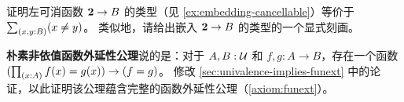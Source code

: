 \begin{ex}\label{ex:cancellable-from-bool}
  证明左可消函数 $\mathbf{2}\to B$ 的类型（见 \cref{ex:embedding-cancellable}）等价于 $\sm{x,y:B}(x\neq y)$。
  类似地，请给出嵌入 $\mathbf{2}\to B$ 的类型的一个显式刻画。
\end{ex}

\begin{ex}\label{ex:funext-from-nondep}
  \textbf{朴素非依值函数外延性公理}说的是：对于 $A,B:\mathcal{U}$ 和 $f,g:A\to B$，存在一个函数 $(\prd{x:A} f(x)=g(x)) \to (f=g)$。
  修改 \cref{sec:univalence-implies-funext} 中的论证，以此证明该公理蕴含完整的函数外延性公理（\cref{axiom:funext}）。
\end{ex}


